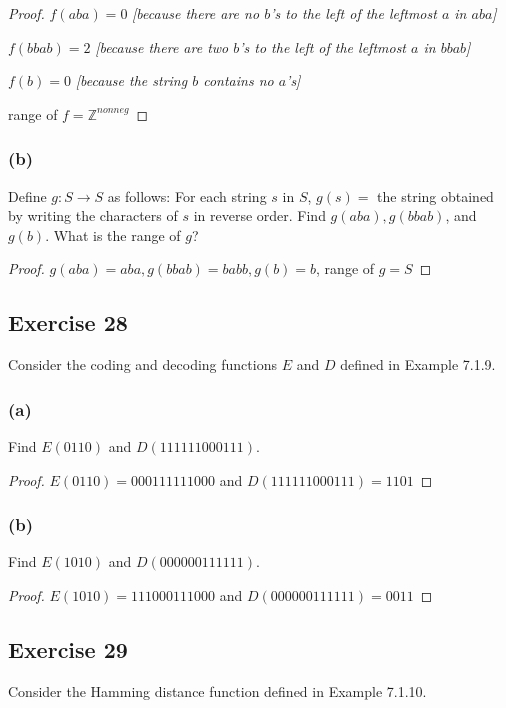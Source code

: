 \documentclass[14pt]{extarticle}
\newcommand{\Z}{\mathbb{Z}}
\begin{document}
\begin{proof}
\(f(aba) = 0\) {\it [because there are no $b$'s to the left
of the leftmost $a$ in $aba$]}

\(f(bbab) = 2\) {\it [because there are two $b$'s to the left of the leftmost $a$ in $bbab$]}

\(f(b) = 0\) {\it [because the string $b$ contains no $a$'s]}

range of \(f = \Z^{nonneg}\)
\end{proof}

\subsubsection{(b)}
Define \(g: S \to S\) as follows: For each string $s$ in $S$, \(g(s) =\) the string obtained by writing the 
characters of $s$ in reverse order. Find \(g(aba), g(bbab)\), and \(g(b)\). What is the range of $g$?

\begin{proof}
\(g(aba) = aba, g(bbab) = babb, g(b) = b\), range of \(g = S\)
\end{proof}

\subsection{Exercise 28}
Consider the coding and decoding functions $E$ and $D$ defined in Example 7.1.9.

\subsubsection{(a)}
Find \(E(0110)\) and \(D(111111000111)\).

\begin{proof}
\(E(0110) = 000111111000\) and \(D(111111000111) = 1101\)
\end{proof}

\subsubsection{(b)}
Find \(E(1010)\) and \(D(000000111111)\).

\begin{proof}
\(E(1010) = 111000111000\) and \(D(000000111111) = 0011\)
\end{proof}

\subsection{Exercise 29}
Consider the Hamming distance function defined in Example 7.1.10.
\end{document}

